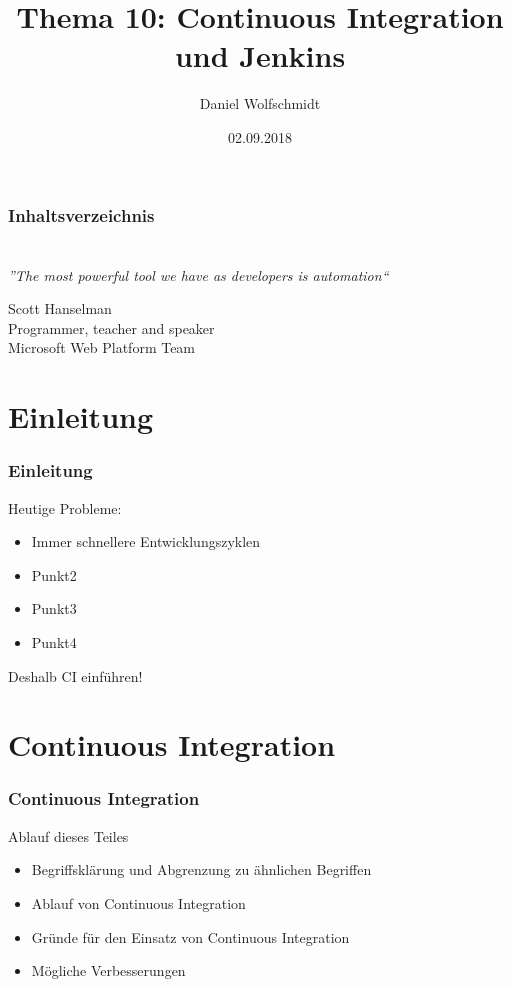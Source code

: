 \documentclass[hyperref={pdfpagelabels=false}]{beamer}
\title{Thema 10: Continuous Integration und Jenkins}
\author{Daniel Wolfschmidt}
\date{02.09.2018}
\begin{document}
\begin{frame}
\titlepage
\end{frame} 


\begin{frame}
\frametitle{Inhaltsverzeichnis}
\setcounter{tocdepth}{1}
\tableofcontents
\end{frame} 





\section{} 
\begin{frame}
\frametitle{} 
\begin{center}
\textit{\LARGE{”The most powerful tool we have as developers is automation“}}
\end{center}
\vspace{0.5cm} 
\begin{flushright}
\footnotesize{Scott Hanselman\\ Programmer, teacher and speaker\\ Microsoft Web Platform Team}
\end{flushright}

\end{frame}


\section*{Einleitung} 
\begin{frame}[t]
\frametitle{Einleitung} 

Heutige Probleme:
\begin{itemize}
\item  Immer schnellere Entwicklungszyklen 
\item  Punkt2
\item  Punkt3
\item  Punkt4
\end{itemize}  


 { \huge{Deshalb CI einführen!}  }

\end{frame}
\section{Continuous Integration} 
\begin{frame} [t]
\frametitle{Continuous Integration} 

Ablauf dieses Teiles
\begin{itemize}
	\item Begriffsklärung und Abgrenzung zu ähnlichen Begriffen
	\item Ablauf von Continuous Integration
	\item Gründe für den Einsatz von Continuous Integration	
	\item Mögliche Verbesserungen	
\end{itemize}

\end{frame}
\end{document}
